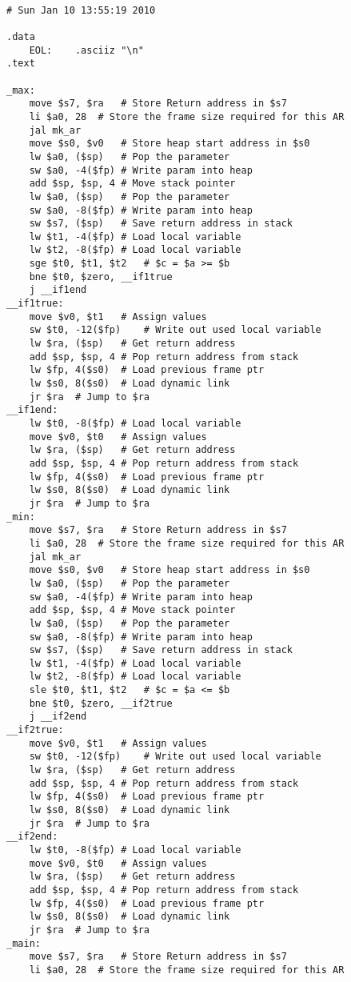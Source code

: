 \begin{lstlisting}[showstringspaces=false,breaklines=true,backgroundcolor=\color{light-gray}, captionpos=b]
         
# Sun Jan 10 13:55:19 2010

.data
	EOL:	.asciiz "\n"
.text

_max:
	move $s7, $ra	# Store Return address in $s7
	li $a0, 28	# Store the frame size required for this AR
	jal mk_ar
	move $s0, $v0	# Store heap start address in $s0
	lw $a0, ($sp)	# Pop the parameter
	sw $a0, -4($fp)	# Write param into heap
	add $sp, $sp, 4	# Move stack pointer
	lw $a0, ($sp)	# Pop the parameter
	sw $a0, -8($fp)	# Write param into heap
	sw $s7, ($sp)	# Save return address in stack
	lw $t1, -4($fp)	# Load local variable
	lw $t2, -8($fp)	# Load local variable
	sge $t0, $t1, $t2	# $c = $a >= $b
	bne $t0, $zero, __if1true
	j __if1end
__if1true:
	move $v0, $t1	# Assign values
	sw $t0, -12($fp)	# Write out used local variable
	lw $ra, ($sp)	# Get return address
	add $sp, $sp, 4	# Pop return address from stack
	lw $fp, 4($s0)	# Load previous frame ptr
	lw $s0, 8($s0)	# Load dynamic link
	jr $ra	# Jump to $ra
__if1end:
	lw $t0, -8($fp)	# Load local variable
	move $v0, $t0	# Assign values
	lw $ra, ($sp)	# Get return address
	add $sp, $sp, 4	# Pop return address from stack
	lw $fp, 4($s0)	# Load previous frame ptr
	lw $s0, 8($s0)	# Load dynamic link
	jr $ra	# Jump to $ra
_min:
	move $s7, $ra	# Store Return address in $s7
	li $a0, 28	# Store the frame size required for this AR
	jal mk_ar
	move $s0, $v0	# Store heap start address in $s0
	lw $a0, ($sp)	# Pop the parameter
	sw $a0, -4($fp)	# Write param into heap
	add $sp, $sp, 4	# Move stack pointer
	lw $a0, ($sp)	# Pop the parameter
	sw $a0, -8($fp)	# Write param into heap
	sw $s7, ($sp)	# Save return address in stack
	lw $t1, -4($fp)	# Load local variable
	lw $t2, -8($fp)	# Load local variable
	sle $t0, $t1, $t2	# $c = $a <= $b
	bne $t0, $zero, __if2true
	j __if2end
__if2true:
	move $v0, $t1	# Assign values
	sw $t0, -12($fp)	# Write out used local variable
	lw $ra, ($sp)	# Get return address
	add $sp, $sp, 4	# Pop return address from stack
	lw $fp, 4($s0)	# Load previous frame ptr
	lw $s0, 8($s0)	# Load dynamic link
	jr $ra	# Jump to $ra
__if2end:
	lw $t0, -8($fp)	# Load local variable
	move $v0, $t0	# Assign values
	lw $ra, ($sp)	# Get return address
	add $sp, $sp, 4	# Pop return address from stack
	lw $fp, 4($s0)	# Load previous frame ptr
	lw $s0, 8($s0)	# Load dynamic link
	jr $ra	# Jump to $ra
_main:
	move $s7, $ra	# Store Return address in $s7
	li $a0, 28	# Store the frame size required for this AR

\end{lstlisting}
